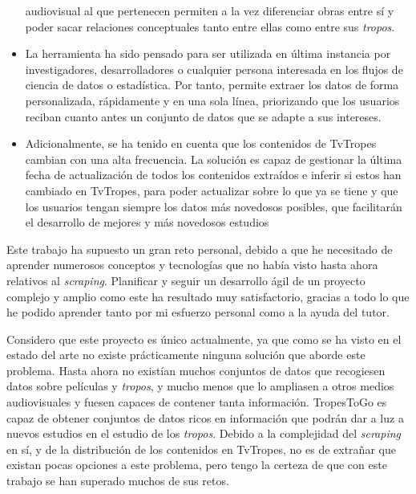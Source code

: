 \begin{itemize}
    audiovisual al que pertenecen permiten a la vez diferenciar obras entre sí y
    poder sacar relaciones conceptuales tanto entre ellas como entre sus
    \textit{tropos}.
    \item La herramienta ha sido pensado para ser utilizada en última instancia
    por investigadores, desarrolladores o cualquier persona interesada en los
    flujos de ciencia de datos o estadística. Por tanto, permite extraer los
    datos de forma personalizada, rápidamente y en una sola línea, priorizando
    que los usuarios reciban cuanto antes un conjunto de datos que se adapte a
    sus intereses.
    \item Adicionalmente, se ha tenido en cuenta que los contenidos de TvTropes
    cambian con una alta frecuencia. La solución es capaz de gestionar la última
    fecha de actualización de todos los contenidos extraídos e inferir si estos
    han cambiado en TvTropes, para poder actualizar sobre lo que ya se tiene y
    que los usuarios tengan siempre los datos más novedosos posibles, que
    facilitarán el desarrollo de mejores y más novedosos estudios
\end{itemize}

Este trabajo ha supuesto un gran reto personal, debido a que he necesitado de
aprender numerosos conceptos y tecnologías que no había visto hasta ahora
relativos al \textit{scraping}. Planificar y seguir un desarrollo ágil de un
proyecto complejo y amplio como este ha resultado muy satisfactorio, gracias a
todo lo que he podido aprender tanto por mi esfuerzo personal como a la
ayuda del tutor.

Considero que este proyecto es único actualmente, ya que como se ha visto en el
estado del arte no existe prácticamente ninguna solución que aborde este
problema. Hasta ahora no existían muchos conjuntos de datos que recogiesen datos
sobre películas y \textit{tropos}, y mucho menos que lo ampliasen a otros medios
audiovisuales y fuesen capaces de contener tanta información. TropesToGo es
capaz de obtener conjuntos de datos ricos en información que podrán dar a luz a
nuevos estudios en el estudio de los \textit{tropos}. Debido a la complejidad
del \textit{scraping} en sí, y de la distribución de los contenidos en TvTropes,
no es de extrañar que existan pocas opciones a este problema, pero tengo la
certeza de que con este trabajo se han superado muchos de sus retos.

